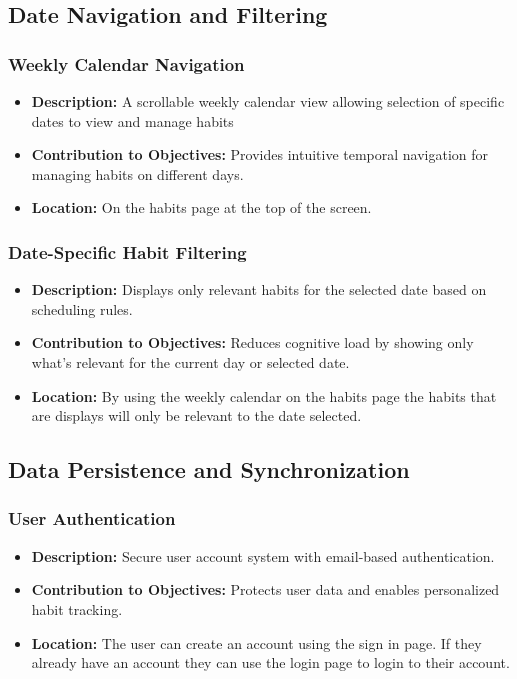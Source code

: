 \subsection{Date Navigation and Filtering}
\subsubsection{Weekly Calendar Navigation}
\begin{itemize}
    \item \textbf{Description:} A scrollable weekly calendar view allowing selection of specific dates to view and manage habits
    \item \textbf{Contribution to Objectives:} Provides intuitive temporal navigation for managing habits on different days.
    \item \textbf{Location:} On the habits page at the top of the screen.
\end{itemize}

\subsubsection{Date-Specific Habit Filtering}
\begin{itemize}
    \item \textbf{Description:} Displays only relevant habits for the selected date based on scheduling rules.
    \item \textbf{Contribution to Objectives:} Reduces cognitive load by showing only what's relevant for the current day or selected date.
    \item \textbf{Location:} By using the weekly calendar on the habits page the habits that are displays will only be relevant to the date selected.
\end{itemize}

\subsection{Data Persistence and Synchronization}
\subsubsection{User Authentication}
\begin{itemize}
    \item \textbf{Description:} Secure user account system with email-based authentication.
    \item \textbf{Contribution to Objectives:} Protects user data and enables personalized habit tracking.
    \item \textbf{Location:} The user can create an account using the sign in page. If they already have an account they can use the login page to login to their account.
\end{itemize}

